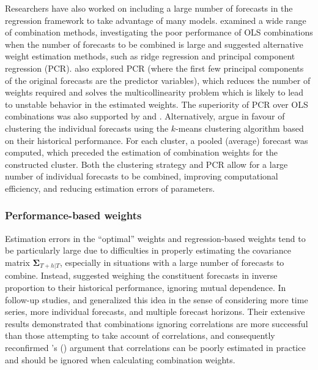 \documentclass[a4paper,11pt]{article}
\def\citeapos#1{\citeauthor{#1}'s (\citeyear{#1})}
\begin{document}
Researchers have also worked on including a large number of forecasts in the regression framework to take advantage of many models. \citet{Chan1999-io} examined a wide range of combination methods, investigating the poor performance of OLS combinations when the number of forecasts to be combined is large and suggested alternative weight estimation methods, such as ridge regression and principal component regression (PCR). \citet{Stock2004-rq} also explored PCR (where the first few principal components of the original forecasts are the predictor variables), which reduces the number of weights required and solves the multicollinearity problem which is likely to lead to unstable behavior in the estimated weights. The superiority of PCR over OLS combinations was also supported by \citet{Rapach2008-jh} and \citet{Poncela2011-vz}. Alternatively, \citet{Aiolfi2006-rh} argue in favour of clustering the individual forecasts using the $k$-means clustering algorithm based on their historical performance. For each cluster, a pooled (average) forecast was computed, which preceded the estimation of combination weights for the constructed cluster. Both the clustering strategy and PCR allow for a large number of individual forecasts to be combined, improving computational efficiency, and reducing estimation errors of parameters.

\subsubsection*{Performance-based weights}

Estimation errors in the ``optimal'' weights and regression-based weights tend to be particularly large due to difficulties in properly estimating the covariance matrix $\bm{\Sigma}_{T+h|T}$, especially in situations with a large number of forecasts to combine. Instead, \citet{Bates1969-yj} suggested weighing the constituent forecasts in inverse proportion to their historical performance, ignoring mutual dependence. In follow-up studies, \citet{Newbold1974-lp} and \citet{Winkler1983-ra} generalized this idea in the sense of considering more time series, more individual forecasts, and multiple forecast horizons. Their extensive results demonstrated that combinations ignoring correlations are more successful than those attempting to take account of correlations, and consequently reconfirmed \citeapos{Bates1969-yj} argument that correlations can be poorly estimated in practice and should be ignored when calculating combination weights.
\end{document}
